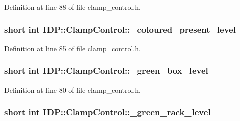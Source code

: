 Definition at line 88 of file clamp\_\-control.h.

\hypertarget{classIDP_1_1ClampControl_ab9e34e39d14e415e3a9b938451fe70a6}{
\subsubsection[{\_\-coloured\_\-present\_\-level}]{\setlength{\rightskip}{0pt plus 5cm}short int {\bf IDP::ClampControl::\_\-coloured\_\-present\_\-level}}}
\label{classIDP_1_1ClampControl_ab9e34e39d14e415e3a9b938451fe70a6}


Definition at line 85 of file clamp\_\-control.h.

\hypertarget{classIDP_1_1ClampControl_a4525ba276d66d2d29a8f1feb956bb769}{
\subsubsection[{\_\-green\_\-box\_\-level}]{\setlength{\rightskip}{0pt plus 5cm}short int {\bf IDP::ClampControl::\_\-green\_\-box\_\-level}}}
\label{classIDP_1_1ClampControl_a4525ba276d66d2d29a8f1feb956bb769}


Definition at line 80 of file clamp\_\-control.h.

\hypertarget{classIDP_1_1ClampControl_af6424de6982b37b9aab8d190b06d51be}{
\subsubsection[{\_\-green\_\-rack\_\-level}]{\setlength{\rightskip}{0pt plus 5cm}short int {\bf IDP::ClampControl::\_\-green\_\-rack\_\-level}}}
\label{classIDP_1_1ClampControl_af6424de6982b37b9aab8d190b06d51be}


